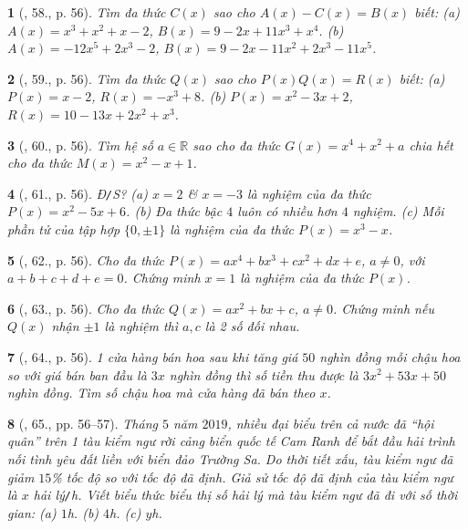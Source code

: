 \documentclass{article}
\newtheorem{baitoan}{}
\begin{document}
\begin{baitoan}[\cite{SBT_Toan_7_Canh_Dieu_tap_2}, 58., p. 56]
	Tìm đa thức $C(x)$ sao cho $A(x) - C(x) = B(x)$ biết: (a) $A(x) = x^3 + x^2 + x - 2$, $B(x) = 9 - 2x + 11x^3 + x^4$. (b) $A(x) = -12x^5 + 2x^3 - 2$, $B(x) = 9 - 2x - 11x^2 + 2x^3 - 11x^5$.
\end{baitoan}

\begin{baitoan}[\cite{SBT_Toan_7_Canh_Dieu_tap_2}, 59., p. 56]
	Tìm đa thức $Q(x)$ sao cho $P(x)Q(x) = R(x)$ biết: (a) $P(x) = x - 2$, $R(x) = -x^3 + 8$. (b) $P(x) = x^2 - 3x + 2$, $R(x) = 10 - 13x + 2x^2 + x^3$.
\end{baitoan}

\begin{baitoan}[\cite{SBT_Toan_7_Canh_Dieu_tap_2}, 60., p. 56]
	Tìm hệ số $a\in\mathbb{R}$ sao cho đa thức $G(x) = x^4 + x^2 + a$ chia hết cho đa thức $M(x) = x^2 - x + 1$.
\end{baitoan}

\begin{baitoan}[\cite{SBT_Toan_7_Canh_Dieu_tap_2}, 61., p. 56]
	\emph{Đ\texttt{/}S?} (a) $x = 2$ \& $x = -3$ là nghiệm của đa thức $P(x) = x^2 - 5x + 6$. (b) Đa thức bậc $4$ luôn có nhiều hơn $4$ nghiệm. (c) Mỗi phần tử của tập hợp $\{0,\pm1\}$ là nghiệm của đa thức $P(x) = x^3 - x$.
\end{baitoan}

\begin{baitoan}[\cite{SBT_Toan_7_Canh_Dieu_tap_2}, 62., p. 56]
	Cho đa thức $P(x) = ax^4 + bx^3 + cx^2 + dx + e$, $a\ne0$, với $a + b + c + d + e = 0$. Chứng minh $x = 1$ là nghiệm của đa thức $P(x)$.
\end{baitoan}

\begin{baitoan}[\cite{SBT_Toan_7_Canh_Dieu_tap_2}, 63., p. 56]
	Cho đa thức $Q(x) = ax^2 + bx + c$, $a\ne0$. Chứng minh nếu $Q(x)$ nhận $\pm1$ là nghiệm thì $a,c$ là 2 số đối nhau.
\end{baitoan}

\begin{baitoan}[\cite{SBT_Toan_7_Canh_Dieu_tap_2}, 64., p. 56]
	1 cửa hàng bán hoa sau khi tăng giá $50$ nghìn đồng mỗi chậu hoa so với giá bán ban đầu là $3x$ nghìn đồng thì số tiền thu được là $3x^2 + 53x + 50$ nghìn đồng. Tìm số chậu hoa mà cửa hàng đã bán theo $x$.
\end{baitoan}

\begin{baitoan}[\cite{SBT_Toan_7_Canh_Dieu_tap_2}, 65., pp. 56--57]
	Tháng $5$ năm $2019$, nhiều đại biểu trên cả nước đã ``hội quân'' trên 1 tàu kiểm ngư rời cảng biển quốc tế Cam Ranh để bắt đầu hải  trình nối tình yêu đất liền với biển đảo Trường Sa. Do thời tiết xấu, tàu kiểm ngư đã giảm $15$\% tốc độ so với tốc độ đã định. Giả sử tốc độ đã định của tàu kiểm ngư là $x$ \emph{hải lý\texttt{/}h}. Viết biểu thức biểu thị số hải lý mà tàu kiểm ngư đã đi với số thời gian: (a) $1$\emph{h}. (b) $4$\emph{h}. (c) $y$\emph{h}.
\end{baitoan}
\end{document}
